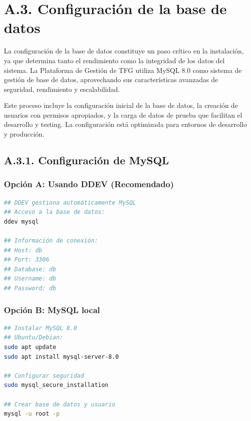 \documentclass[12pt,a4paper,oneside]{report}
\begin{document}
\section{A.3. Configuración de la base de
datos}\label{a.3.-configuraciuxf3n-de-la-base-de-datos}

La configuración de la base de datos constituye un paso crítico en la instalación, ya que determina tanto el rendimiento como la integridad de los datos del sistema. La Plataforma de Gestión de TFG utiliza MySQL 8.0 como sistema de gestión de base de datos, aprovechando sus características avanzadas de seguridad, rendimiento y escalabilidad.

Este proceso incluye la configuración inicial de la base de datos, la creación de usuarios con permisos apropiados, y la carga de datos de prueba que facilitan el desarrollo y testing. La configuración está optimizada para entornos de desarrollo y producción.

\subsection{A.3.1. Configuración de
MySQL}\label{a.3.1.-configuraciuxf3n-de-mysql}

\subsubsection{Opción A: Usando DDEV
(Recomendado)}\label{opciuxf3n-a-usando-ddev-recomendado}

\begin{lstlisting}[language=bash]
## DDEV gestiona automáticamente MySQL
## Acceso a la base de datos:
ddev mysql

## Información de conexión:
## Host: db
## Port: 3306  
## Database: db
## Username: db
## Password: db
\end{lstlisting}

\subsubsection{Opción B: MySQL local}\label{opciuxf3n-b-mysql-local}

\begin{lstlisting}[language=bash]
## Instalar MySQL 8.0
## Ubuntu/Debian:
sudo apt update
sudo apt install mysql-server-8.0

## Configurar seguridad
sudo mysql_secure_installation

## Crear base de datos y usuario
mysql -u root -p
\end{lstlisting}
\end{document}
